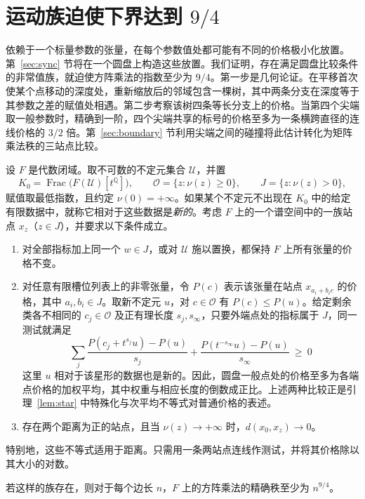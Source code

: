 \section{运动族迫使下界达到 \texorpdfstring{$9/4$}{9/4}}\label{sec:motion}

依赖于一个标量参数的张量，在每个参数值处都可能有不同的价格极小化放置。第~\ref{sec:sync} 节将在一个圆盘上构造这些放置。我们证明，存在满足圆盘比较条件的非常值族，就迫使方阵乘法的指数至少为 \(9/4\)。第一步是几何论证。在平移首次使某个点移动的深度处，重新缩放后的邻域包含一棵树，其中两条分支在深度等于其参数之差的赋值处相遇。第二步考察该树四条等长分支上的价格。当第四个尖端取一般参数时，精确到一阶，四个尖端共享的标号的价格至多为一条横跨直径的连线价格的 \(3/2\) 倍。第~\ref{sec:boundary} 节利用尖端之间的碰撞将此估计转化为矩阵乘法秩的三站点比较。

设 \(F\) 是代数闭域。取不可数的不定元集合 \(\mathcal U\)，并置
\[
 K_0=\operatorname{Frac}\bigl(F(\mathcal U)[t^{\mathbb Q}]\bigr),
 \qquad \mathcal O=\{z:\nu(z)\ge0\},\qquad J=\{z:\nu(z)>0\},
\]
赋值取最低指数，且约定 \(\nu(0)=+\infty\)。如果某个不定元不出现在 \(K_0\) 中的给定有限数据中，就称它相对于这些数据是\emph{新的}。考虑 \(F\) 上的一个谱空间中的一族站点 \(x_z\)（\(z\in J\)），并要求以下条件成立。
\begin{enumerate}
\item 对全部指标加上同一个 \(w\in J\)，或对 \(\mathcal U\) 施以置换，都保持 \(F\) 上所有张量的价格不变。
\item 对任意有限槽位列表上的非零张量，令 \(P(c)\) 表示该张量在站点 \(x_{a_i+b_i c}\) 的价格，其中 \(a_i,b_i\in J\)。取新不定元 \(u\)，对 \(c\in\mathcal O\) 有 \(P(c)\le P(u)\)。给定剩余类各不相同的 \(c_j\in\mathcal O\) 及正有理长度 \(s_j,s_\infty\)，只要外端点处的指标属于 \(J\)，同一测试就满足
\begin{equation}\label{eq:motion-star}
   \sum_j\frac{P(c_j+t^{s_j}u)-P(u)}{s_j}
       +\frac{P(t^{-s_\infty}u)-P(u)}{s_\infty}\ \ge\ 0
  \end{equation}
这里 \(u\) 相对于该星形的数据也是新的。因此，圆盘一般点处的价格至多为各端点价格的加权平均，其中权重与相应长度的倒数成正比。上述两种比较正是引理~\ref{lem:star} 中特殊化与次平均不等式对普通价格的表述。
\item 存在两个距离为正的站点，且当 \(\nu(z)\to+\infty\) 时，\(d(x_0,x_z)\to0\)。
\end{enumerate}
特别地，这些不等式适用于距离。只需用一条两站点连线作测试，并将其价格除以其大小的对数。

\begin{theorem}[解析运动的刚性]\label{thm:motion}
若这样的族存在，则对于每个边长 $n$，$F$ 上的方阵乘法的精确秩至少为 $n^{9/4}$。
\end{theorem}

